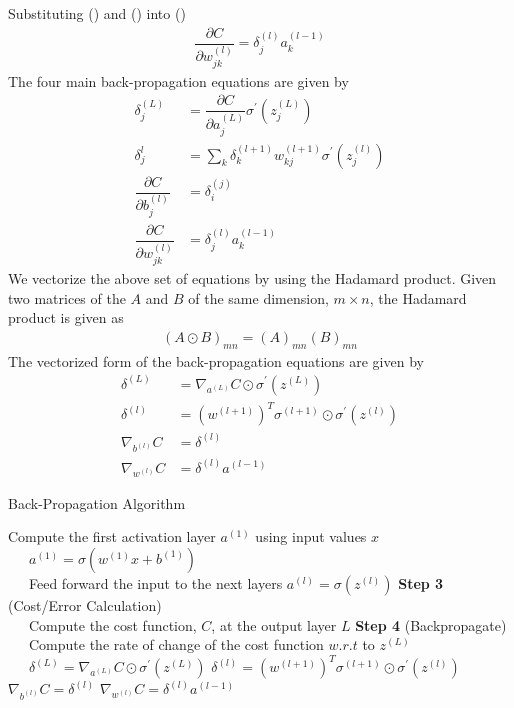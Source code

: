Substituting () and () into ()
\begin{align}
  \label{eq:BP_EQ_VEC_4}
  \dfrac{\partial C}{\partial w_{jk}^{(l)}} = \delta_j^{(l)}a_k^{(l-1)}
\end{align}
The four main back-propagation equations are given by 
\begin{align}
  \delta_j^{(L)} &= \dfrac{\partial C }{\partial a_j^{(L)}} \sigma^{'}(z_j^{(L)}) \\
  \delta_j^l &= \sum_k \delta_k^{(l+1)} w_{kj}^{(l+1)} \sigma^{'}(z_j^{(l)})\\
  \dfrac{\partial C}{\partial b_j^{(l)}} &= \delta_i^{(j)} \\
  \dfrac{\partial C}{\partial w_{jk}^{(l)}} &= \delta_j^{(l)}a_k^{(l-1)}
\end{align}
We vectorize the above set of equations by using the Hadamard product. Given two matrices of the $A$ and $B$ of the same dimension, $m \times n$, the Hadamard product is given as
\begin{align*}
  (A \odot B)_{mn} = (A)_{mn} (B)_{mn} 
\end{align*}
The vectorized form of the back-propagation equations are given by 
\begin{align}
  \delta^{(L)} &= \nabla_{a^{(L)}}C \odot \sigma^{'}(z^{(L)}) \\
  \delta^{(l)} &= (w^{(l+1)})^T\sigma^{(l+1)} \odot \sigma^{'}(z^{(l)}) \\
  \nabla_{b^{(l)}} C &= \delta^{(l)} \\
  \nabla_{w^{(l)}} C &= \delta^{(l)}a^{(l-1)}
\end{align}
\begin{algorithm}[H]
  \caption{Back-Propagation Algorithm}\label{alg:back_propagation_algo}
  \begin{algorithmic}[1]
  Compute the first activation layer $a^{(1)}$ using input values $x$ \\
  \, \, \, $a^{(1)} = \sigma(w^{(1)}x + b^{(1)} )$
  \\
  \, \, \, Feed forward the input to the next layers
    \State $a^{(l)} = \sigma(z^{(l)})$
  \EndFor  
  \State \textbf{Step 3} (Cost/Error Calculation)\\
  \, \, \, Compute the cost function, $C$, at the output layer $L$
  \State \textbf{Step 4} (Backpropagate) \\
  \, \, \, Compute the rate of change of the cost function $w.r.t$ to $z^{(L)}$\\
  \, \, \,  $\delta^{(L)} = \nabla_{a^{(L)}}C \odot \sigma^{'}(z^{(L)})$
    \State $\delta^{(l)} = (w^{(l+1)})^T\sigma^{(l+1)} \odot \sigma^{'}(z^{(l)})$
    \State $\nabla_{b^{(l)}} C = \delta^{(l)}$
    \State $\nabla_{w^{(l)}} C = \delta^{(l)}a^{(l-1)}$
  \EndFor
\end{algorithmic}
\end{algorithm}
